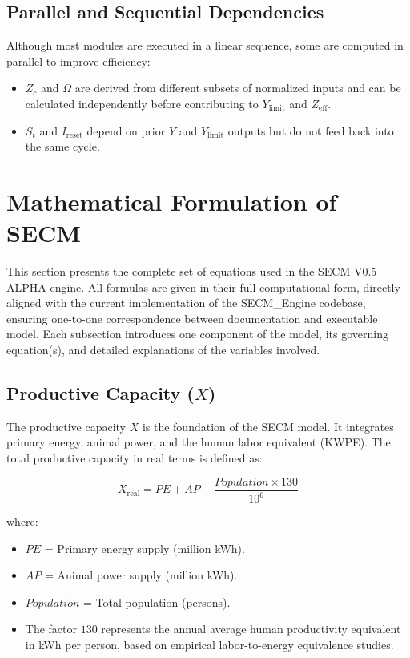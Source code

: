 \documentclass[12pt,a4paper]{article}
\begin{document}
\subsection{Parallel and Sequential Dependencies}
Although most modules are executed in a linear sequence, some are computed in parallel to improve efficiency:
\begin{itemize}
    \item \(Z_c\) and \(\Omega\) are derived from different subsets of normalized inputs and can be calculated independently before contributing to \(Y_{\mathrm{limit}}\) and \(Z_{\mathrm{eff}}\).
    \item \(S_t\) and \(I_{\mathrm{reset}}\) depend on prior \(Y\) and \(Y_{\mathrm{limit}}\) outputs but do not feed back into the same cycle.
\end{itemize}

\section{Mathematical Formulation of SECM}
\label{sec:equations}

This section presents the complete set of equations used in the SECM V0.5 ALPHA engine. 
All formulas are given in their full computational form, directly aligned with the current implementation of the SECM\_Engine codebase, ensuring one-to-one correspondence between documentation and executable model. 
Each subsection introduces one component of the model, its governing equation(s), and detailed explanations of the variables involved.

\subsection{Productive Capacity (\texorpdfstring{$X$}{X})}

The productive capacity $X$ is the foundation of the SECM model. 
It integrates primary energy, animal power, and the human labor equivalent (KWPE). 
The total productive capacity in real terms is defined as:

\begin{equation}
X_{\mathrm{real}} = PE + AP + \frac{Population \times 130}{10^6}
\end{equation}

\noindent where:
\begin{itemize}
    \item $PE$ = Primary energy supply (million kWh).
    \item $AP$ = Animal power supply (million kWh).
    \item $Population$ = Total population (persons).
    \item The factor $130$ represents the annual average human productivity equivalent in kWh per person, based on empirical labor-to-energy equivalence studies.
\end{itemize}
\end{document}
